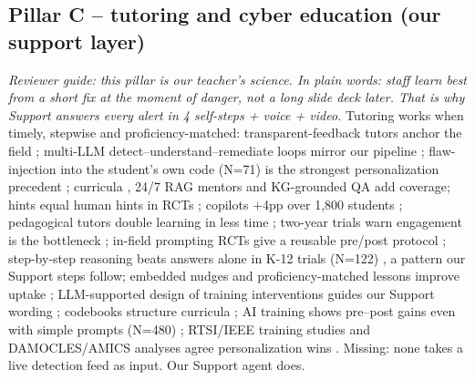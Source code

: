 \documentclass[11pt,a4paper]{article}
\begin{document}
\subsection{Pillar C -- tutoring and cyber education (our support layer)}
\noindent\textit{Reviewer guide: this pillar is our teacher's science. In plain words: staff learn best from a short fix at the moment of danger, not a long slide deck later. That is why Support answers every alert in 4 self-steps + voice + video.}
Tutoring works when timely, stepwise and proficiency-matched: transparent-feedback tutors anchor the field \cite{SENSAI25}; multi-LLM detect--understand--remediate loops mirror our pipeline \cite{SYNAPSE26}; flaw-injection into the student's own code (N=71) is the strongest personalization precedent \cite{Frazier26}; curricula \cite{CurricuLLM26}, 24/7 RAG mentors \cite{CyberMentor25} and KG-grounded QA \cite{CyberQ24} add coverage; hints equal human hints in RCTs \cite{Pardos24}; copilots +4pp over 1,800 students \cite{TutorCopilot24}; pedagogical tutors double learning in less time \cite{Kestin25}; two-year trials warn engagement is the bottleneck \cite{Khanmigo25}; in-field prompting RCTs give a reusable pre/post protocol \cite{Vanzo25}; step-by-step reasoning beats answers alone in K-12 trials (N=122) \cite{Blasco24}, a pattern our Support steps follow; embedded nudges and proficiency-matched lessons improve uptake \cite{Lain24,SchoniCHI25}; LLM-supported design of training interventions guides our Support wording \cite{GrecoCEUR24}; codebooks structure curricula \cite{Codebook24}; AI training shows pre--post gains even with simple prompts (N=480) \cite{Greco25}; RTSI/IEEE training studies and DAMOCLES/AMICS analyses agree personalization wins \cite{Sriganthan25,DAMOCLES24,Zhou25,SchoniEU24}. Missing: none takes a live detection feed as input. Our Support agent does.
\end{document}
